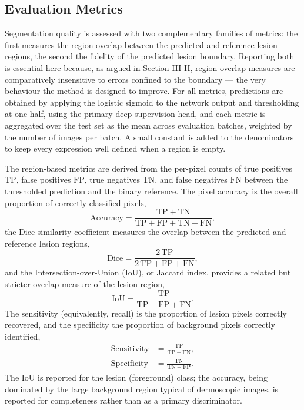 \subsection{Evaluation Metrics}

Segmentation quality is assessed with two complementary families of metrics: the first measures the region overlap between the predicted and reference lesion regions, the second the fidelity of the predicted lesion boundary. Reporting both is essential here because, as argued in Section III-H, region-overlap measures are comparatively insensitive to errors confined to the boundary --- the very behaviour the method is designed to improve. For all metrics, predictions are obtained by applying the logistic sigmoid to the network output and thresholding at one half, using the primary deep-supervision head, and each metric is aggregated over the test set as the mean across evaluation batches, weighted by the number of images per batch. A small constant is added to the denominators to keep every expression well defined when a region is empty.

The region-based metrics are derived from the per-pixel counts of true positives $\mathrm{TP}$, false positives $\mathrm{FP}$, true negatives $\mathrm{TN}$, and false negatives $\mathrm{FN}$ between the thresholded prediction and the binary reference. The pixel accuracy is the overall proportion of correctly classified pixels,
\begin{equation}
\mathrm{Accuracy} = \frac{\mathrm{TP}+\mathrm{TN}}{\mathrm{TP}+\mathrm{FP}+\mathrm{TN}+\mathrm{FN}}, \tag{8}
\label{eq:8}
\end{equation}
the Dice similarity coefficient measures the overlap between the predicted and reference lesion regions,
\begin{equation}
\mathrm{Dice} = \frac{2\,\mathrm{TP}}{2\,\mathrm{TP}+\mathrm{FP}+\mathrm{FN}}, \tag{9}
\label{eq:9}
\end{equation}
and the Intersection-over-Union (IoU), or Jaccard index, provides a related but stricter overlap measure of the lesion region,
\begin{equation}
\mathrm{IoU} = \frac{\mathrm{TP}}{\mathrm{TP}+\mathrm{FP}+\mathrm{FN}}. \tag{10}
\label{eq:10}
\end{equation}
The sensitivity (equivalently, recall) is the proportion of lesion pixels correctly recovered, and the specificity the proportion of background pixels correctly identified,
\begin{equation}
\begin{aligned}
\mathrm{Sensitivity} &= \frac{\mathrm{TP}}{\mathrm{TP}+\mathrm{FN}}, \\
\mathrm{Specificity} &= \frac{\mathrm{TN}}{\mathrm{TN}+\mathrm{FP}}.
\end{aligned} \tag{11}
\label{eq:11}
\end{equation}
The IoU is reported for the lesion (foreground) class; the accuracy, being dominated by the large background region typical of dermoscopic images, is reported for completeness rather than as a primary discriminator.

